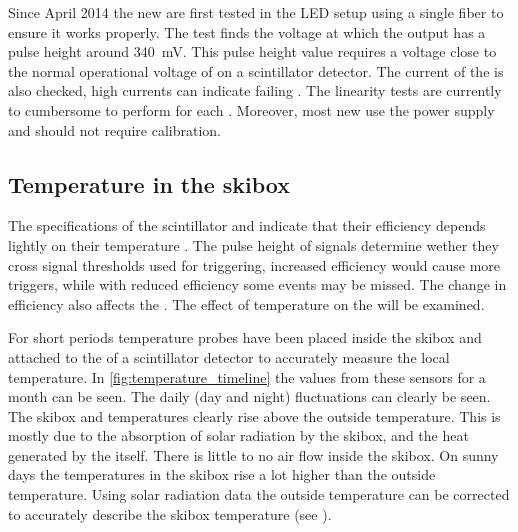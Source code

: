 Since April 2014 the new \nikhef \pmts are first tested in the LED setup using a single fiber to ensure it works properly. The test finds the voltage at which the output has a pulse height around \SI{340}{\milli\volt}. This pulse height value requires a voltage close to the normal operational voltage of \pmts on a scintillator detector. The current of the \pmt is also checked, high currents can indicate failing \pmts. The linearity tests are currently to cumbersome to perform for each \pmt. Moreover, most new \pmts use the \nikhef power supply and should not require calibration.


\subsection{Temperature in the skibox}

The specifications of the scintillator and \pmt indicate that their efficiency depends lightly on their temperature \cite{sgc2011bc408,et2010pmt}. The pulse height of signals determine wether they cross signal thresholds used for triggering, increased efficiency would cause more triggers, while with reduced efficiency some events may be missed. The change in efficiency also affects the \mpv. The effect of temperature on the \mpv will be examined.

For short periods temperature probes have been placed inside the skibox and attached to the \pmt of a scintillator detector to accurately measure the local temperature. In \cref{fig:temperature_timeline} the values from these sensors for a month can be seen. The daily (day and night) fluctuations can clearly be seen. The skibox and \pmt temperatures clearly rise above the outside temperature. This is mostly due to the absorption of solar radiation by the skibox, and the heat generated by the \pmt itself. There is little to no air flow inside the skibox. On sunny days the temperatures in the skibox rise a lot higher than the outside temperature. Using solar radiation data the outside temperature can be corrected to accurately describe the skibox temperature (see \cite[Figure 7.7]{devries2012weather}).

